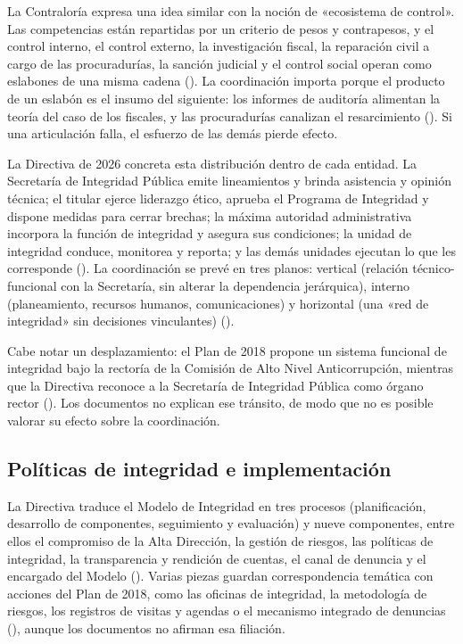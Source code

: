 \documentclass[Afour,sageh,times]{sagej}
\begin{document}
La Contraloría expresa una idea similar con la noción de «ecosistema de control». Las competencias están repartidas por un criterio de pesos y contrapesos, y el control interno, el control externo, la investigación fiscal, la reparación civil a cargo de las procuradurías, la sanción judicial y el control social operan como eslabones de una misma cadena (\citealp{contraloria2020corrupcion}). La coordinación importa porque el producto de un eslabón es el insumo del siguiente: los informes de auditoría alimentan la teoría del caso de los fiscales, y las procuradurías canalizan el resarcimiento (\citealp{contraloria2020corrupcion}). Si una articulación falla, el esfuerzo de las demás pierde efecto.

La Directiva de 2026 concreta esta distribución dentro de cada entidad. La Secretaría de Integridad Pública emite lineamientos y brinda asistencia y opinión técnica; el titular ejerce liderazgo ético, aprueba el Programa de Integridad y dispone medidas para cerrar brechas; la máxima autoridad administrativa incorpora la función de integridad y asegura sus condiciones; la unidad de integridad conduce, monitorea y reporta; y las demás unidades ejecutan lo que les corresponde (\citealp{pcm2026directiva}). La coordinación se prevé en tres planos: vertical (relación técnico-funcional con la Secretaría, sin alterar la dependencia jerárquica), interno (planeamiento, recursos humanos, comunicaciones) y horizontal (una «red de integridad» sin decisiones vinculantes) (\citealp{pcm2026directiva}).

Cabe notar un desplazamiento: el Plan de 2018 propone un sistema funcional de integridad bajo la rectoría de la Comisión de Alto Nivel Anticorrupción, mientras que la Directiva reconoce a la Secretaría de Integridad Pública como órgano rector (\citealp{pcm2018plan,pcm2026directiva}). Los documentos no explican ese tránsito, de modo que no es posible valorar su efecto sobre la coordinación.

\subsection{Políticas de integridad e implementación}
\label{subsec:politicas-implementacion}

La Directiva traduce el Modelo de Integridad en tres procesos (planificación, desarrollo de componentes, seguimiento y evaluación) y nueve componentes, entre ellos el compromiso de la Alta Dirección, la gestión de riesgos, las políticas de integridad, la transparencia y rendición de cuentas, el canal de denuncia y el encargado del Modelo (\citealp{pcm2026directiva}). Varias piezas guardan correspondencia temática con acciones del Plan de 2018, como las oficinas de integridad, la metodología de riesgos, los registros de visitas y agendas o el mecanismo integrado de denuncias (\citealp{pcm2018plan}), aunque los documentos no afirman esa filiación.
\end{document}
